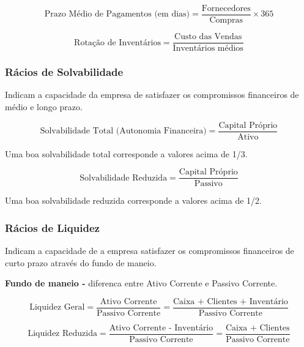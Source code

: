 \documentclass[11pt]{article}
\begin{document}
\begin{equation*}
    \textrm{Prazo Médio de Pagamentos (em dias)} =
    \frac{\textrm{Fornecedores}}{\textrm{Compras}} \times 365
\end{equation*}

\begin{equation*}
    \textrm{Rotação de Inventários} =
    \frac{\textrm{Custo das Vendas}}{\textrm{Inventários médios}}
\end{equation*}

\subsubsection{Rácios de Solvabilidade}

Indicam a capacidade da empresa de satisfazer os compromissos financeiros de médio e longo prazo.

\begin{equation*}
    \textrm{Solvabilidade Total (Autonomia Financeira)} =
    \frac{\textrm{Capital Próprio}}{\textrm{Ativo}}
\end{equation*}

Uma boa solvabilidade total corresponde a valores acima de 1/3.

\begin{equation*}
    \textrm{Solvabilidade Reduzida} =
    \frac{\textrm{Capital Próprio}}{\textrm{Passivo}}
\end{equation*}

Uma boa solvabilidade reduzida corresponde a valores acima de 1/2.

\subsubsection{Rácios de Liquidez}

Indicam a capacidade de a empresa satisfazer os compromissos financeiros de curto prazo através do fundo de maneio.

\textbf{Fundo de maneio -} diferenca entre Ativo Corrente e Passivo Corrente.

\begin{equation*}
    \textrm{Liquidez Geral} =
    \frac{\textrm{Ativo Corrente}}{\textrm{Passivo Corrente}} =
    \frac{\textrm{Caixa + Clientes + Inventário}}{\textrm{Passivo Corrente}}
\end{equation*}

\begin{equation*}
    \textrm{Liquidez Reduzida} =
    \frac{\textrm{Ativo Corrente - Inventário}}{\textrm{Passivo Corrente}} =
    \frac{\textrm{Caixa + Clientes}}{\textrm{Passivo Corrente}}
\end{equation*}
\end{document}
